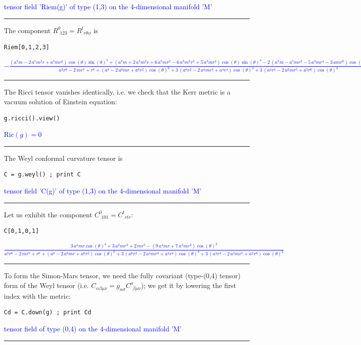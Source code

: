 \documentclass[a4paper]{jpconf}
\newcommand{\soutput}[1]{\textcolor{blue}{#1}\\[-0.8ex]\rule{\textwidth}{0.4pt}}
\begin{document}
\soutput{tensor field 'Riem(g)' of type (1,3) on the 4-dimensional manifold 'M'}
The component $R^0_{\ \, 123} = R^t_{\ \, r\theta\phi}$ is 
\begin{verbatim}
Riem[0,1,2,3]
\end{verbatim}
\soutput{\tiny $-\frac{{\left(a^{7} m - 2 \, a^{5} m^{2} r + a^{5} m r^{2}\right)}
\cos\left(\theta\right) \sin\left(\theta\right)^{5} + {\left(a^{7} m + 2
\, a^{5} m^{2} r + 6 \, a^{5} m r^{2} - 6 \, a^{3} m^{2} r^{3} + 5 \,
a^{3} m r^{4}\right)} \cos\left(\theta\right)
\sin\left(\theta\right)^{3} - 2 \, {\left(a^{7} m - a^{5} m r^{2} - 5 \,
a^{3} m r^{4} - 3 \, a m r^{6}\right)} \cos\left(\theta\right)
\sin\left(\theta\right)}{a^{2} r^{6} - 2 \, m r^{7} + r^{8} +
{\left(a^{8} - 2 \, a^{6} m r + a^{6} r^{2}\right)}
\cos\left(\theta\right)^{6} + 3 \, {\left(a^{6} r^{2} - 2 \, a^{4} m
r^{3} + a^{4} r^{4}\right)} \cos\left(\theta\right)^{4} + 3 \,
{\left(a^{4} r^{4} - 2 \, a^{2} m r^{5} + a^{2} r^{6}\right)}
\cos\left(\theta\right)^{2}}$}
The Ricci tensor vanishes identically, i.e. we check that the Kerr metric is 
a vacuum solution of Einstein equation:
\begin{verbatim}
g.ricci().view()
\end{verbatim}
\soutput{$\mathrm{Ric}(g) = 0$}
The Weyl conformal curvature tensor is
\begin{verbatim}
C = g.weyl() ; print C
\end{verbatim}
\soutput{tensor field 'C(g)' of type (1,3) on the 4-dimensional manifold 'M'}
Let us exhibit the component $C^0_{\ \, 101}=C^t_{\ \, rtr}$:
\begin{verbatim}
C[0,1,0,1]
\end{verbatim}
\soutput{$\frac{3 \, a^{4} m r \cos\left(\theta\right)^{4} + 3 \, a^{2} m r^{3} +
2 \, m r^{5} - {\left(9 \, a^{4} m r + 7 \, a^{2} m r^{3}\right)}
\cos\left(\theta\right)^{2}}{a^{2} r^{6} - 2 \, m r^{7} + r^{8} +
{\left(a^{8} - 2 \, a^{6} m r + a^{6} r^{2}\right)}
\cos\left(\theta\right)^{6} + 3 \, {\left(a^{6} r^{2} - 2 \, a^{4} m
r^{3} + a^{4} r^{4}\right)} \cos\left(\theta\right)^{4} + 3 \,
{\left(a^{4} r^{4} - 2 \, a^{2} m r^{5} + a^{2} r^{6}\right)}
\cos\left(\theta\right)^{2}}$}
To form the Simon-Mars tensor, we need the fully covariant (type-(0,4) tensor) form of the Weyl tensor (i.e. $C_{\alpha\beta\mu\nu} = g_{\alpha\sigma} C^\sigma_{\ \, \beta\mu\nu}$); we get it by lowering the first index with the metric:
\begin{verbatim}
Cd = C.down(g) ; print Cd
\end{verbatim}
\soutput{tensor field of type (0,4) on the 4-dimensional manifold 'M'}
\end{document}
